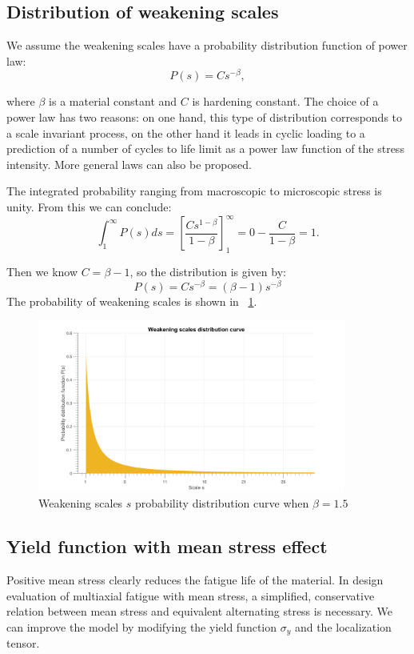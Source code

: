\documentclass[3p,times,number,review]{elsarticle}
\newcommand{\figref}[1]{\figurename~\ref{#1}}
\begin{document}
\vspace{6pt}

\subsection{Distribution of weakening scales}

We assume the weakening scales have a  probability distribution function of power law:
$$P(s) = Cs^{-\beta},$$

where $\beta$ is a material constant and $C$ is hardening constant. 
The choice of a power law has two reasons: on one hand, this type of distribution corresponds to a scale invariant process, on the other hand it leads in cyclic loading to a prediction of a number of cycles to life limit as a power law function of the stress intensity. More general laws can also be proposed.

The integrated probability ranging from macroscopic to microscopic stress  is unity. From this we can conclude:
$$\int_{1}^{\infty}P(s)ds=\left[ \frac{Cs^{1-\beta}}{1-\beta}\right] _{1}^{\infty}=0-\frac{C}{1-\beta}=1.$$


Then we know $C=\beta-1$, so the distribution is given by:
$$P(s) = Cs^{-\beta}=(\beta-1)s^{-\beta}$$
The probability of weakening scales is shown in \figref{ps}.
\begin{figure}[!h]
	\centering
	\includegraphics[width=0.9\textwidth]{figures//ps.png} 
	\caption{Weakening scales $s$ probability distribution curve when $\beta=1.5$ }
	\label{ps}
\end{figure}


\subsection{Yield function with mean stress effect}

Positive mean stress clearly reduces the fatigue life of the material. In design evaluation of multiaxial fatigue with mean stress, a simplified, conservative relation between mean stress and equivalent alternating stress is necessary. We can improve the model by modifying the yield function $\sigma_y$ and the localization tensor.
\end{document}
